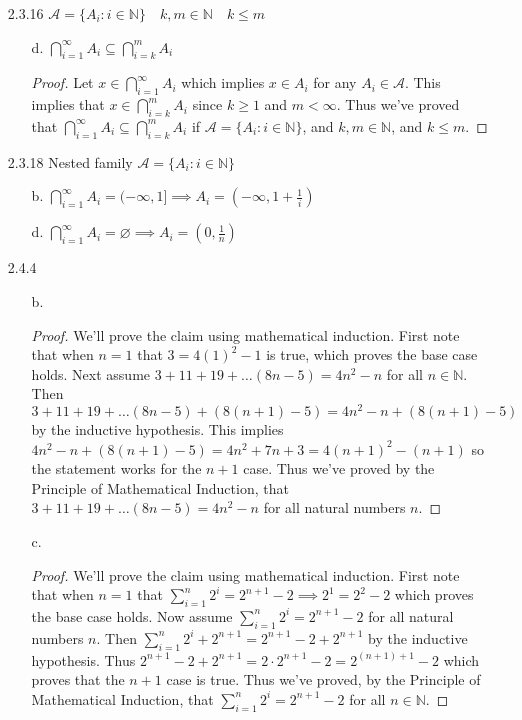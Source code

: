 \documentclass[11pt]{amsart}
\theoremstyle{definition}
\begin{document}
\begin{itemize}
\begin{itemize}
\end{itemize}

\item[2.3.16] $\mathscr{A}=\{A_i:i\in\mathbb{N}\}\quad k,m\in\mathbb{N}\quad k\le m$
\begin{itemize}
    \item[d.] $\displaystyle\bigcap_{i=1}^{\infty}A_i\subseteq \bigcap_{i=k}^{m}A_i\ $
    \begin{proof}
        Let $x\in\bigcap_{i=1}^{\infty}A_i$ which implies $x\in A_i$ for any $A_i\in\mathscr{A}$. This implies that $x\in\bigcap_{i=k}^{m}A_i$ since $k\ge 1$ and $m<\infty$. Thus we've proved that $\bigcap_{i=1}^{\infty}A_i\subseteq \bigcap_{i=k}^{m}A_i$ if $\mathscr{A}=\{A_i:i\in\mathbb{N}\}$, and $k,m\in\mathbb{N}$, and $k\le m$.
    \end{proof}
    
\end{itemize}

\item[2.3.18] Nested family $\mathscr{A}=\{A_i:i\in\mathbb{N}\}$
\begin{itemize}
    \item[b.] $\bigcap_{i=1}^\infty A_i=(-\infty,1]\implies A_i=(-\infty,1+\frac1i)$
    
    \item[d.] $\bigcap_{i=1}^\infty A_i=\varnothing\implies A_i=(0,\frac1n)$
    
\end{itemize}

\item[2.4.4]
\begin{itemize}
    \item[b.]\begin{proof}
        We’ll prove the claim using mathematical induction. First note that when $n=1$ that $3=4(1)^2-1$ is true, which proves the base case holds. Next assume $3+11+19+\ldots(8n-5)=4n^2-n$ for all $n\in\mathbb{N}$. Then $3+11+19+\ldots(8n-5)+(8(n+1)-5)=4n^2-n+(8(n+1)-5)$ by the inductive hypothesis. This implies $4n^2-n+(8(n+1)-5)=4n^2+7n+3=4(n+1)^2-(n+1)$ so the statement works for the $n+1$ case. Thus we've proved by the Principle of Mathematical Induction, that $3+11+19+\ldots(8n-5)=4n^2-n$ for all natural numbers $n$.
    \end{proof}
    
    \item[c.]\begin{proof}
        We’ll prove the claim using mathematical induction. First note that when $n=1$ that $\sum_{i=1}^n2^i=2^{n+1}-2\implies 2^1=2^{2}-2$ which proves the base case holds. Now assume $\sum_{i=1}^n2^i=2^{n+1}-2$ for all natural numbers $n$. Then $\sum_{i=1}^n2^i+2^{n+1}=2^{n+1}-2+2^{n+1}$ by the inductive hypothesis. Thus $2^{n+1}-2+2^{n+1}=2\cdot 2^{n+1}-2=2^{(n+1)+1}-2$ which proves that the $n+1$ case is true. Thus we've proved, by the Principle of Mathematical Induction, that $\sum_{i=1}^n2^i=2^{n+1}-2$ for all $n\in\mathbb{N}$.
    \end{proof}


\end{itemize}
\end{itemize}
\end{document}
